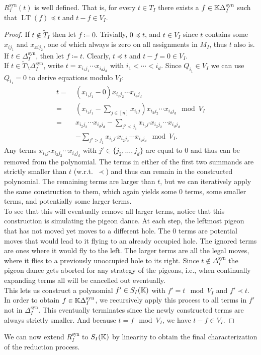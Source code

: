 \documentclass{article}
\newcommand{\LT}{\operatorname{LT}}
\newcommand{\Rsyn}{R^\mathrm{syn}}
\newcommand{\Dsyn}{\Delta^\mathrm{syn}}
\begin{document}
\begin{theorem} \label{RsynDef}
    $\Rsyn_I(t)$ is well defined. That is, for every $t \in T_I$ there exists a $f \in \KK \Dsyn_I$ such that $\LT(f) \preceq t$ and $t - f \in V_I$.
\end{theorem}
\begin{proof}
    If $t \not\in \tilde T_I$ then let $f \coloneqq 0$. Trivially, $0 \preceq t$, and $t \in V_I$ since $t$ contains some $x_{i j_1}$ and $x_{x i j_2}$, one of which always is zero on all assignments in $M_I$, thus $t$ also is.\\
    If $t \in \Dsyn_I$, then let $f \coloneqq t$. Clearly, $t \preceq t$ and $t - f = 0 \in V_I$.\\
    If $t \in \tilde T \setminus \Dsyn_I$, write $t = x_{i_1 j_1} \cdots x_{i_d j_d}$ with $i_1 < \cdots < i_d$. Since $Q_{i_1} \in V_I$ we can use $Q_{i_1} = 0$ to derive equations modulo $V_I$:
    \begin{align*}
        t = \ &(x_{i_1 j_1} - 0) x_{i_2 j_2} \cdots x_{i_d j_d}\\
        = \ & \left(x_{i_1 j_1} - \sum_{j \in [n]} x_{i_1 j}\right) x_{i_2 j_2} \cdots x_{i_d j_d} \mod V_I\\
        = \ &x_{i_2 j_2} \cdots x_{i_d j_d} - \sum_{j' < j_1} x_{i_1 j'} x_{i_2 j_2} \cdots x_{i_d j_d}\\
        &- \sum_{j' > j_1} x_{i_1 j'} x_{i_2 j_2} \cdots x_{i_d j_d} \mod V_I.
    \end{align*}
    Any terms $x_{i_1 j'} x_{i_2 j_2} \cdots x_{i_d j_d}$ with $j' \in \{j_2, \ldots, j_d\}$ are equal to $0$ and thus can be removed from the polynomial. The terms in either of the first two summands are strictly smaller than $t$ (w.r.t.\ $\prec$) and thus can remain in the constructed polynomial. The remaining terms are larger than $t$, but we can iteratively apply the same construction to them, which again yields some $0$ terms, some smaller terms, and potentially some larger terms.\\
    To see that this will eventually remove all larger terms, notice that this construction is simulating the pigeon dance. At each step, the leftmost pigeon that has not moved yet moves to a different hole. The $0$ terms are potential moves that would lead to it flying to an already occupied hole. The ignored terms are ones where it would fly to the left. The larger terms are all the legal moves, where it flies to a previously unoccupied hole to its right. Since $t \not\in \Dsyn_I$ the pigeon dance gets aborted for any strategy of the pigeons, i.e., when continually expanding terms all will be cancelled out eventually.\\
    This lets us construct a polynomial $f' \in S_I(\mathbb{K})$ with $f' = t \mod V_I$ and $f' \prec t$. In order to obtain $f \in \KK \Dsyn_I$, we recursively apply this process to all terms in $f'$ not in $\Dsyn_I$. This eventually terminates since the newly constructed terms are always strictly smaller. And because $t = f \mod V_I$, we have $t - f \in V_I$.
\end{proof}
We can now extend $\Rsyn_I$ to $S_I(\mathbb{K})$ by linearity to obtain the final characterization of the reduction process.
\end{document}
